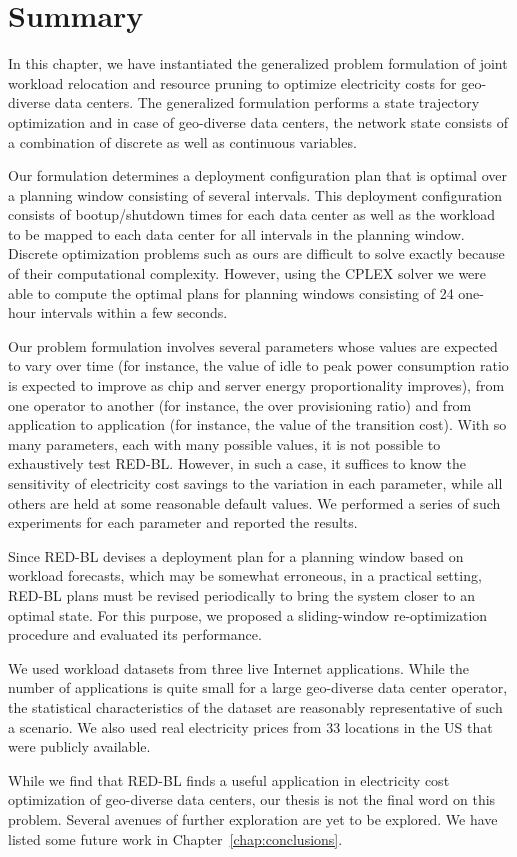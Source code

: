 \section{Summary}
In this chapter, we have instantiated the generalized problem formulation of joint workload relocation and resource pruning to optimize electricity costs for geo-diverse data centers. The generalized formulation performs a state trajectory optimization and in case of geo-diverse data centers, the network state consists of a combination of discrete as well as continuous variables. 

Our formulation determines a deployment configuration plan that is optimal over a planning window consisting of several intervals. This deployment configuration consists of bootup/shutdown times for each data center as well as the workload to be mapped to each data center for all intervals in the planning window. Discrete optimization problems such as ours are difficult to solve exactly because of their computational complexity. However, using the CPLEX solver we were able to compute the optimal plans for planning windows consisting of 24 one-hour intervals within a few seconds. 

Our problem formulation involves several parameters whose values are expected to vary over time (for instance, the value of idle to peak power consumption ratio is expected to improve as chip and server energy proportionality improves), from one operator to another (for instance, the over provisioning ratio) and from application to application (for instance, the value of the transition cost). With so many parameters, each with many possible values, it is not possible to exhaustively test RED-BL. However, in such a case, it suffices to know the sensitivity of electricity cost savings to the variation in each parameter, while all others are held at some reasonable default values. We performed a series of such experiments for each parameter and reported the results.

Since RED-BL devises a deployment plan for a planning window based on workload forecasts, which may be somewhat erroneous, in a practical setting, RED-BL plans must be revised periodically to bring the system closer to an optimal state. For this purpose, we proposed a sliding-window re-optimization procedure and evaluated its performance.

We used workload datasets from three live Internet applications. While the number of applications is quite small for a large geo-diverse data center operator, the statistical characteristics of the dataset are reasonably representative of such a scenario. We also used real electricity prices from 33 locations in the US that were publicly available.

While we find that RED-BL finds a useful application in electricity cost optimization of geo-diverse data centers, our thesis is not the final word on this problem. Several avenues of further exploration are yet to be explored. We have listed some future work in Chapter~\ref{chap:conclusions}.